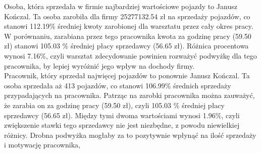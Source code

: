 \documentclass{article}\usepackage[]{graphicx}\usepackage[]{xcolor}
\begin{document}
Osoba, która sprzedała w firmie najbardziej wartościowe pojazdy to Janusz Kończal. Ta osoba zarobiła dla firmy 25277132.54 zł na sprzedaży pojazdów, co stanowi 112.19\% średniej kwoty zarobionej dla warsztatu przez cały okres pracy. W porównaniu, zarabiana przez tego pracownika kwota za godzinę pracy (59.50 zł) stanowi 105.03 \% średniej płacy sprzedawcy (56.65 zł). Różnica procentowa wynosi 7.16\%, czyli warsztat zdecydowanie powinien rozważyć podwyżkę dla tego pracownika, by lepiej wyróżnić jego wpływ na dochody firmy. \\

Pracownik, który sprzedał najwięcej pojazdów to ponownie Janusz Kończal. Ta osoba sprzedała aż 413 pojazdów, co stanowi 106.99\% średnich sprzedaży przypadających na pracownika. Patrząc na zarobki pracownika można zauważyć, że zarabia on za godzinę pracy (59.50 zł), czyli 105.03 \% średniej płacy sprzedawcy (56.65 zł). Między tymi dwoma wartościami wynosi 1.96\%, czyli zwiększenie stawki tego sprzedawcy nie jest niezbędne, z powodu niewielkiej różnicy. Drobna podwyżka mogłaby za to pozytywnie wpłynąć na ilość sprzedaży i motywację pracownika, 
\end{document}
